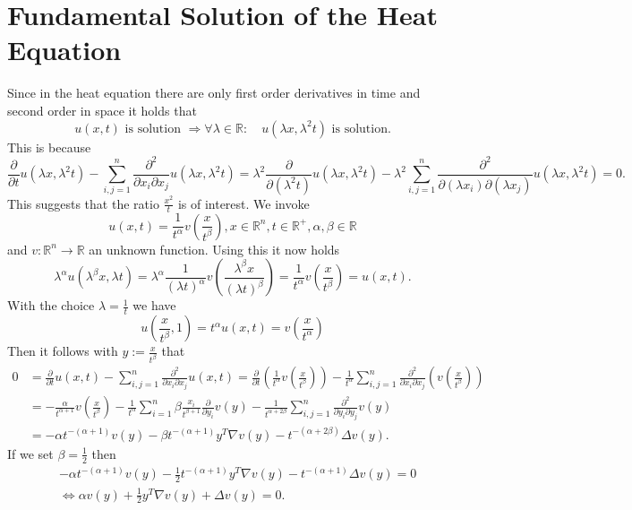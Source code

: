 \documentclass[A4,12pt,twoside]{book}
\begin{document}
\section{Fundamental Solution of the Heat Equation}
Since in the heat equation there are only first order derivatives in time and second order in space it holds that 
\[
u(x,t) \text{ is solution } \Rightarrow \forall \lambda\in \mathbb{R}: \quad u(\lambda x , \lambda^2 t) \text{ is solution.}
\]
This is because 
\[
\frac{\partial}{\partial t} u(\lambda x, \lambda^2 t) - \sum_{i,j=1}^n \frac{\partial^2}{\partial x_i \partial x_j} u(\lambda x, \lambda^2 t) = \lambda^2 \frac{\partial}{\partial (\lambda^2 t)} u(\lambda x, \lambda^2 t) - \lambda^2 \sum_{i,j=1}^n \frac{\partial^2}{\partial (\lambda x_i) \partial (\lambda x_j)} u(\lambda x, \lambda^2 t) =0.
\]
This suggests that the ratio $\frac{x^2}{t}$ is of interest. We invoke 
\[
u(x,t) = \frac{1}{t^\alpha}  v\left( \frac{x}{t^\beta} \right), x \in \mathbb{R}^n, t \in \mathbb{R}^+, \alpha,\beta \in \mathbb{R}
\]
and $v: \mathbb{R}^n \to \mathbb{R}$ an unknown function. Using this it now holds 
\[
\lambda^\alpha u(\lambda^\beta x, \lambda t) = \lambda^\alpha \frac{1}{(\lambda t)^\alpha} v \left( \frac{\lambda^\beta x}{(\lambda t)^\beta} \right) = \frac{1}{t^\alpha} v \left( \frac{x}{t^\beta} \right) = u(x,t).
\]
With the choice $\lambda = \frac{1}{t}$ we have 
\[
u(\frac{x}{t^\beta},1) = t^\alpha u(x,t) = v\left(\frac{x}{t^\alpha}\right)
\]
Then it follows with $y := \frac{x}{t^\beta}$ that
\begin{align*}
   0&= \frac{\partial}{\partial t} u(x,t) - \sum_{i,j=1}^n \frac{\partial^2}{\partial x_i \partial x_j} u(x,t) = \frac{\partial}{\partial t} \left( \frac{1}{t^\alpha}  v\left( \frac{x}{t^\beta} \right) \right) - \frac{1}{t^\alpha} \sum_{i,j=1}^n \frac{\partial^2}{\partial x_i \partial x_j} \left(   v\left( \frac{x}{t^\beta} \right) \right)\\
    &= -\frac{\alpha}{t^{\alpha+1}}v\left( \frac{x}{t^\beta} \right)- \frac{1}{t^\alpha} \sum_{i=1}^n \beta \frac{x_i}{t^{\beta+1}} \frac{\partial}{\partial y_i}   v\left( y \right) - \frac{1}{t^{ \alpha + 2\beta}} \sum_{i,j=1}^n \frac{\partial^2}{\partial y_i \partial y_j}  v\left( y \right)\\
    &= - \alpha t^{-(\alpha+1)} v(y) - \beta t^{- (\alpha+1)} y^T \nabla v(y) - t^{-( \alpha +2 \beta)} \Delta v(y).
\end{align*}
If we set $\beta = \frac{1}{2}$ then 
\begin{align*}
     &- \alpha t^{-(\alpha+1)} v(y) - \frac{1}{2} t^{- (\alpha+1)} y^T \nabla v(y) - t^{-( \alpha +1)} \Delta v(y) =0  \\
     &\iff \alpha  v(y) + \frac{1}{2} y^T \nabla v(y) +  \Delta v(y) =0.
\end{align*}
\end{document}
